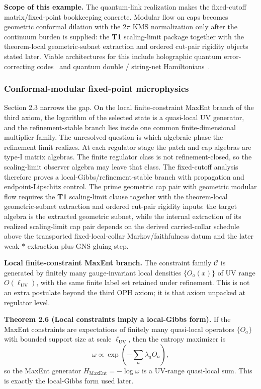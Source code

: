 \textbf{Scope of this example.} The quantum-link realization makes the fixed-cutoff matrix/fixed-point bookkeeping concrete. Modular flow on caps becomes geometric conformal dilation with the \(2\pi\) KMS normalization only after the continuum burden is supplied: the \textbf{T1} scaling-limit package together with the theorem-local geometric-subnet extraction and ordered cut-pair rigidity objects stated later. Viable architectures for this include holographic quantum error-correcting codes~\cite{pastawski15} and quantum double / string-net Hamiltonians~\cite{levinWen05}.

\subsubsection{Conformal-modular fixed-point microphysics}\label{27-conformal-modular-fixed-point-microphysics-cmfp}

Section 2.3 narrows the gap. On the local finite-constraint MaxEnt branch of the third axiom, the logarithm of the selected state is a quasi-local UV generator, and the refinement-stable branch lies inside one common finite-dimensional multiplier family. The unresolved question is which algebraic phase the refinement limit realizes. At each regulator stage the patch and cap algebras are type-I matrix algebras. The finite regulator class is not refinement-closed, so the scaling-limit observer algebra may leave that class. The fixed-cutoff analysis therefore proves a local-Gibbs/refinement-stable branch with propagation and endpoint-Lipschitz control. The prime geometric cap pair with geometric modular flow requires the \textbf{T1} scaling-limit clause together with the theorem-local geometric-subnet extraction and ordered cut-pair rigidity inputs: the target algebra is the extracted geometric subnet, while the internal extraction of its realized scaling-limit cap pair depends on the derived carried-collar schedule above the transported fixed-local-collar Markov/faithfulness datum and the later weak-\(*\) extraction plus GNS gluing step.

\textbf{Local finite-constraint MaxEnt branch.} The constraint family \(\mathcal C\) is generated by finitely many gauge-invariant local densities \(\{O_a(x)\}\) of UV range \(O(\ell_{\mathrm{UV}})\), with the same finite label set retained under refinement. This is not an extra postulate beyond the third OPH axiom; it is that axiom unpacked at regulator level.

\textbf{Theorem 2.6 (Local constraints imply a local-Gibbs form).} If the MaxEnt constraints are expectations of finitely many quasi-local operators \(\{O_a\}\) with bounded support size at scale \(\ell_{\mathrm{UV}}\), then the entropy maximizer is
\[
\omega \propto \exp\!\left(-\sum_a \lambda_a O_a\right),
\]
so the MaxEnt generator \(H_{\mathrm{MaxEnt}}=-\log\omega\) is a UV-range quasi-local sum. This is exactly the local-Gibbs form used later.

